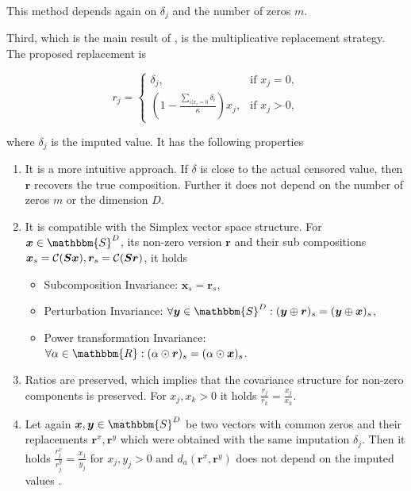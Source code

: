 This method depends again on $\delta_j$ and the number of zeros $m$. 

Third, which is the main result of \cite{Josep:2003}, is the multiplicative replacement strategy. The proposed replacement is 

\begin{equation}
r_j = 
\begin{cases}
\delta_j, & \text{if } x_j=0, \\
\left( 1- \frac{\sum_{i | x_i=0}\delta_i}{\kappa} \right)x_j, & \text{if } x_j>0, 
\end{cases}
\label{eq:multiplicative replacement strategy}
\end{equation}

where $\delta_j$ is the imputed value. It has the following properties

\begin{enumerate}
	\item It is a more intuitive approach. If $\delta$ is close to the actual censored value, then $\bm{r}$ recovers the true composition. Further it does not depend on the number of zeros $m$ or the dimension $D$. 
	\item It is compatible with the Simplex vector space structure. For $\bm{x} \in \mathbbm{S}^D$, its non-zero version $\bm{r}$ and their sub compositions $\bm{x}_s = \mathcal{C}(\bm{Sx}),\bm{r}_s = \mathcal{C}(\bm{Sr})$, it holds 
	\begin{itemize}
		\item Subcomposition Invariance: $\bm{x}_s = \bm{r}_s$,
		\item Perturbation Invariance: $\forall \bm{y} \in \mathbbm{S}^D: (\bm{y} \oplus \bm{r})_s = (\bm{y} \oplus \bm{x})_s$,
		\item Power transformation Invariance: $\forall \alpha \in \mathbbm{R}: (\alpha \odot \bm{r})_s = (\alpha \odot \bm{x})_s$. 
	\end{itemize}
	\item Ratios are preserved, which implies that the covariance structure for non-zero components is preserved. For  $x_j,x_k >0$ it holds $\frac{r_j}{r_k} = \frac{x_j}{x_k}$. 
	\item Let again $\bm{x},\bm{y} \in \mathbbm{S}^D$ be two vectors with common zeros and their replacements $\bm{r}^x,\bm{r}^y$ which were obtained with the same imputation $\delta_j$. Then it holds $\frac{r^x_j}{r^y_j}=\frac{x_j}{y_j}$ for $x_j,y_j>0$ and $d_a(\bm{r}^x,\bm{r}^y)$ does not depend on the imputed values \cite{Josep:2003}. 
\end{enumerate}

